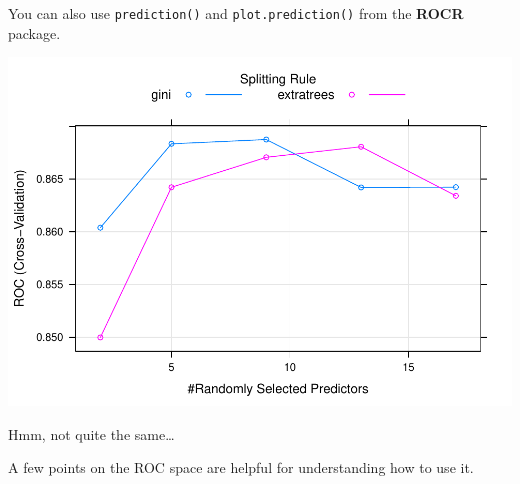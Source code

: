 \documentclass[
]{book}
\newenvironment{Shaded}{\begin{snugshade}}{\end{snugshade}}
\newcommand{\DataTypeTok}[1]{\textcolor[rgb]{0.13,0.29,0.53}{#1}}
\newcommand{\DecValTok}[1]{\textcolor[rgb]{0.00,0.00,0.81}{#1}}
\newcommand{\KeywordTok}[1]{\textcolor[rgb]{0.13,0.29,0.53}{\textbf{#1}}}
\newcommand{\NormalTok}[1]{#1}
\newcommand{\OperatorTok}[1]{\textcolor[rgb]{0.81,0.36,0.00}{\textbf{#1}}}
\newcommand{\StringTok}[1]{\textcolor[rgb]{0.31,0.60,0.02}{#1}}
\begin{document}
You can also use \texttt{prediction()} and \texttt{plot.prediction()} from the \textbf{ROCR} package.

\begin{Shaded}
\end{Shaded}

\includegraphics{data-sci_files/figure-latex/unnamed-chunk-79-1.pdf}

Hmm, not quite the same\ldots{}

A few points on the ROC space are helpful for understanding how to use it.
\end{document}
